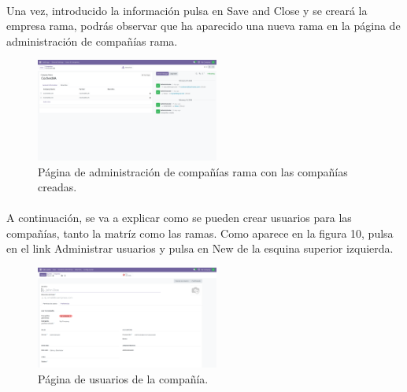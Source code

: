 \documentclass[paper=a4wide, fontsize=11pt]{report}	 %
\begin{document}
\paragraph{}
Una vez, introducido la información pulsa en Save and Close y se creará la empresa rama, podrás observar que ha aparecido una nueva rama en la página de administración de compañías rama.
\begin{figure}[h]
    \centering
    \includegraphics[width=6cm]{ramasCreadas.png}
    \caption{Página de administración de compañías rama con las compañías creadas.}
    \label{fig:faqs}
\end{figure}
\paragraph{}
A continuación, se va a explicar como se pueden crear usuarios para las compañías, tanto la matríz como las ramas. Como aparece en la figura 10, pulsa en el link Administrar usuarios y pulsa en New de la esquina superior izquierda. 
\begin{figure}[h]
    \centering
    \includegraphics[width=6cm]{adminUsuarios.png}
    \caption{Página de usuarios de la compañía.}
    \label{fig:faqs}
\end{figure}
\paragraph{}
\end{document}
